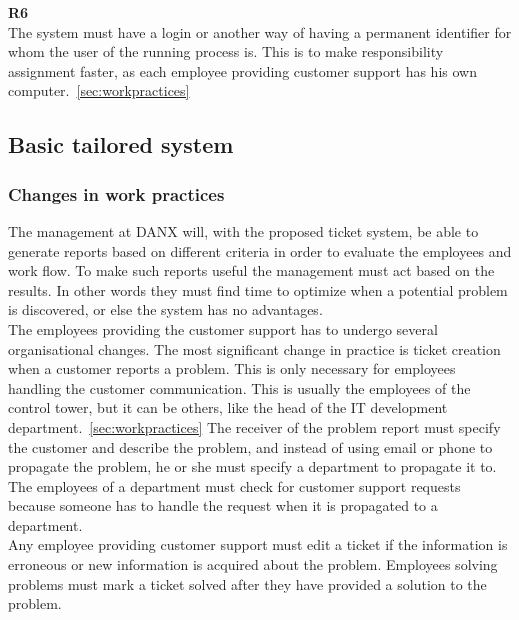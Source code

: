 \textbf{R6} \\
The system must have a login or another way of having a permanent identifier for whom the user of the running process is. This is to make responsibility assignment faster, as each employee providing customer support has his own computer.~\ref{sec:workpractices}

\subsection{Basic tailored system}
\subsubsection{Changes in work practices}
The management at DANX will, with the proposed ticket system, be able to generate reports based on different criteria in order to evaluate the employees and work flow. To make such reports useful the management must act based on the results. In other words they must find time to optimize when a potential problem is discovered, or else the system has no advantages.\\
The employees providing the customer support has to undergo several organisational changes. The most significant change in practice is ticket creation when a customer reports a problem. This is only necessary for employees handling the customer communication. This is usually the employees of the control tower, but it can be others, like the head of the IT development department.~\ref{sec:workpractices} The receiver of the problem report must specify the customer and describe the problem, and instead of using email or phone to propagate the problem, he or she must specify a department to propagate it to.\\
The employees of a department must check for customer support requests because someone has to handle the request when it is propagated to a department. \\
Any employee providing customer support must edit a ticket if the information is erroneous or new information is acquired about the problem. Employees solving problems must mark a ticket solved after they have provided a solution to the problem.

